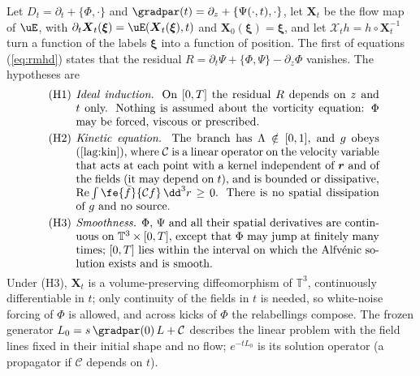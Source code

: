 Let $D_t=\partial_t+\{\Phi,\cdot\}$ and $\gradpar(t)=\partial_z+\{\Psi(\cdot,t),\cdot\}$, let $\boldsymbol X_t$ be the flow map of $\uE$, with $\partial_t\boldsymbol X_t(\boldsymbol\xi)=\uE(\boldsymbol X_t(\boldsymbol\xi),t)$ and $\boldsymbol X_0(\boldsymbol\xi)=\boldsymbol\xi$, and let $\mathcal X_th=h\circ\boldsymbol X_t^{-1}$ turn a function of the labels $\boldsymbol\xi$ into a function of position. The first of equations (\ref{eq:rmhd}) states that the residual $R=\partial_t\Psi+\{\Phi,\Psi\}-\partial_z\Phi$ vanishes. The hypotheses are
\begin{equation}\label{eq:hyp}
\begin{minipage}{0.86\linewidth}
\begin{list}{}{\setlength{\leftmargin}{2.9em}\setlength{\labelwidth}{2.5em}\setlength{\labelsep}{0.4em}\setlength{\itemsep}{0.6ex}\setlength{\parsep}{0pt}\setlength{\topsep}{0pt}}
\item[(H1)] \emph{Ideal induction.} On $[0,T]$ the residual $R$ depends on $z$ and $t$ only. Nothing is assumed about the vorticity equation: $\Phi$ may be forced, viscous or prescribed.
\item[(H2)] \emph{Kinetic equation.} The branch has $\Lambda\notin[0,1]$, and $g$ obeys (\ref{lag:kin}), where $\mathcal C$ is a linear operator on the velocity variable that acts at each point with a kernel independent of $\boldsymbol r$ and of the fields (it may depend on $t$), and is bounded or dissipative, $\mathrm{Re}\int\fe{\bar f}{\mathcal Cf}\,\dd^3r\ge0$. There is no spatial dissipation of $g$ and no source.
\item[(H3)] \emph{Smoothness.} $\Phi$, $\Psi$ and all their spatial derivatives are continuous on $\mathbb T^3\times[0,T]$, except that $\Phi$ may jump at finitely many times; $[0,T]$ lies within the interval on which the Alfv\'enic solution exists and is smooth.
\end{list}
\end{minipage}
\end{equation}
Under (H3), $\boldsymbol X_t$ is a volume-preserving diffeomorphism of $\mathbb T^3$, continuously differentiable in $t$; only continuity of the fields in $t$ is needed, so white-noise forcing of $\Phi$ is allowed, and across kicks of $\Phi$ the relabellings compose. The frozen generator $L_0=s\,\gradpar(0)\,L+\mathcal C$ describes the linear problem with the field lines fixed in their initial shape and no flow; $e^{-tL_0}$ is its solution operator (a propagator if $\mathcal C$ depends on $t$).

